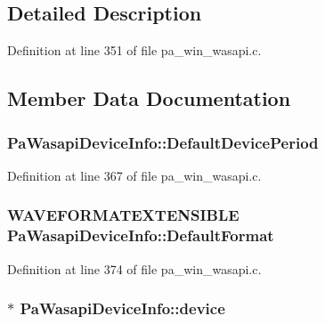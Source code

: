 \subsection{Detailed Description}


Definition at line 351 of file pa\+\_\+win\+\_\+wasapi.\+c.



\subsection{Member Data Documentation}
\subsubsection[{\texorpdfstring{Default\+Device\+Period}{DefaultDevicePeriod}}]{ Pa\+Wasapi\+Device\+Info\+::\+Default\+Device\+Period}\hypertarget{struct_pa_wasapi_device_info_a0639bc7454ecd808aa7fed3ed1436822}{}\label{struct_pa_wasapi_device_info_a0639bc7454ecd808aa7fed3ed1436822}


Definition at line 367 of file pa\+\_\+win\+\_\+wasapi.\+c.

\subsubsection[{\texorpdfstring{Default\+Format}{DefaultFormat}}]{\setlength{\rightskip}{0pt plus 5cm}W\+A\+V\+E\+F\+O\+R\+M\+A\+T\+E\+X\+T\+E\+N\+S\+I\+B\+LE Pa\+Wasapi\+Device\+Info\+::\+Default\+Format}\hypertarget{struct_pa_wasapi_device_info_a68b444dda6b3735f450435b7d0085791}{}\label{struct_pa_wasapi_device_info_a68b444dda6b3735f450435b7d0085791}


Definition at line 374 of file pa\+\_\+win\+\_\+wasapi.\+c.

\subsubsection[{\texorpdfstring{device}{device}}]{$\ast$ Pa\+Wasapi\+Device\+Info\+::device}\hypertarget{struct_pa_wasapi_device_info_ae0c5e0acfb5e38e2c42f2dd11d8f0e80}{}\label{struct_pa_wasapi_device_info_ae0c5e0acfb5e38e2c42f2dd11d8f0e80}


